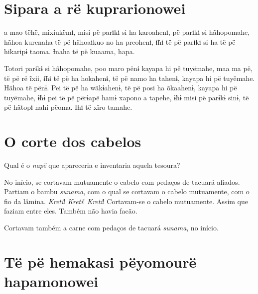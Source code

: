 \chapter{Sipara a rë kuprarionowei}
 
 a mao tëhë, mixiukëmɨ, misi pë parɨkɨ si ha karoahenɨ, pë
parɨkɨ si hãhopomahe, hãhoa kurenaha të pë hãhoaɨkuo no ha preohenɨ,
ɨ̃hɨ të pë parɨkɨ si ha të pë hikaripɨ taoma. Ɨnaha të pë kuaama, hapa. 

Totori parɨkɨ si hãhopomahe, poo maro pënɨ kayapa hi pë tuyëmahe, maa ma
pë, të pë rë ĩxii, ɨ̃hɨ të pë ha hokahenɨ, të pë namo ha tahenɨ, kayapa
hi pë tuyëmahe. Hãhoa të pënɨ. Pei të pë ha wãkɨahenɨ, të pë posi ha
õkaahenɨ, kayapa hi pë tuyëmahe, ɨ̃hɨ pei të pë përɨapë hamɨ xapono a
tapehe, ɨ̃hɨ misi pë parɨkɨ sinɨ, të pë hãtopɨ nahi pëoma. Ɨhɨ të xĩro
tamahe. 

\chapter{O corte dos cabelos}
 
  

Qual é o \textit{napë} que apareceria e inventaria aquela tesoura?

No início, se cortavam mutuamente o cabelo com pedaços de tacuará
afiados. Partiam o bambu \textit{sunama}, com o qual se cortavam o cabelo
mutuamente, com o fio da lâmina. \textit{Kreti}! \textit{Kreti}! \textit{Kreti}! Cortavam-se o
cabelo mutuamente. Assim que faziam entre eles. Também não havia facão. 

Cortavam também a carne com pedaços de tacuará \textit{sunama}, no início.

\chapter[Të pë hemakasi pëyomou rë hapamonowei]{Të pë hemakasi pëyomou\break rë hapamonowei}
 
